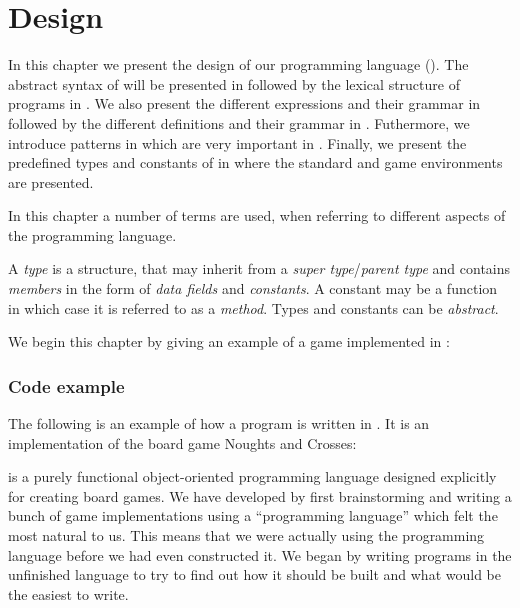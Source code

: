 \chapter{Design}
\label{chap:design}

In this chapter we present the design of our programming language
(\productname{}). The abstract syntax of \productname{} will be presented in
 followed by the lexical structure of programs in
. We also present the different expressions and
their grammar in  followed by the different definitions
and their grammar in . Futhermore, we introduce patterns
in  which are very important in \productname{}.  Finally,
we present the predefined types and constants of \productname{} in
 where the standard and game environments are presented.

In this chapter a number of terms are used, when referring to different aspects
of the programming language.

A \emph{type} is a structure, that may inherit from a \emph{super
type}/\emph{parent type} and contains \emph{members} in the form of \emph{data
fields} and \emph{constants}. A constant may be a function in which case it is
referred to as a \emph{method}. Types and constants can be \emph{abstract}.

We begin this chapter by giving an example of a game implemented in
\productname{}:

\subsection*{Code example}
\label{codesample}

The following is an example of how a program is written in \productname{}. It is
an implementation of the board game Noughts and Crosses:


\productname{} is a purely functional object-oriented programming language
designed explicitly for creating board games. We have developed \productname{}
by first brainstorming and writing a bunch of game implementations using a
``programming language'' which felt the most natural to us. This means that we 
were actually using the programming language before we had even constructed
it. We began by writing programs in the unfinished language to try to find out
how it should be built and what would be the easiest to write. 


